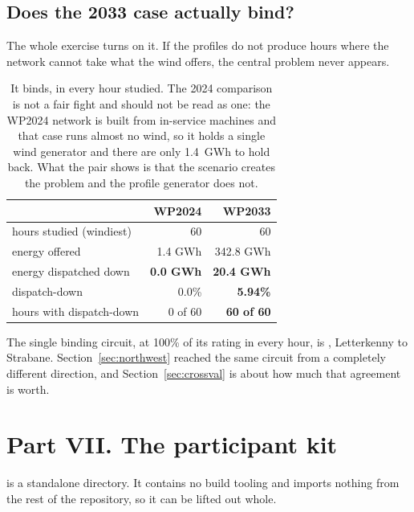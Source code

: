 \documentclass[11pt,a4paper]{article}
\begin{document}
\subsection{Does the 2033 case actually bind?}

The whole exercise turns on it. If the profiles do not produce hours where the
network cannot take what the wind offers, the central problem never appears.

\begin{table}[H]\centering\small
\begin{tabular}{lrr}
\toprule
& \textbf{WP2024} & \textbf{WP2033} \\
\midrule
hours studied (windiest) & 60 & 60 \\
energy offered   & 1.4 GWh & 342.8 GWh \\
energy dispatched down & \textbf{0.0 GWh} & \textbf{20.4 GWh} \\
dispatch-down    & 0.0\% & \textbf{5.94\%} \\
hours with dispatch-down & 0 of 60 & \textbf{60 of 60} \\
\bottomrule
\end{tabular}
\caption{It binds, in every hour studied. The 2024 comparison is not a fair
fight and should not be read as one: the WP2024 network is built from
in-service machines and that case runs almost no wind, so it holds a single
wind generator and there are only 1.4~GWh to hold back. What the pair shows is
that the scenario creates the problem and the profile generator does not.}
\end{table}

The single binding circuit, at 100\% of its rating in every hour, is
, Letterkenny to Strabane. Section~\ref{sec:northwest}
reached the same circuit from a completely different direction, and
Section~\ref{sec:crossval} is about how much that agreement is worth.


\clearpage
\section{Part VII. The participant kit}
\label{sec:kit}

 is a standalone directory. It contains no build tooling
and imports nothing from the rest of the repository, so it can be lifted out
whole.
\end{document}
